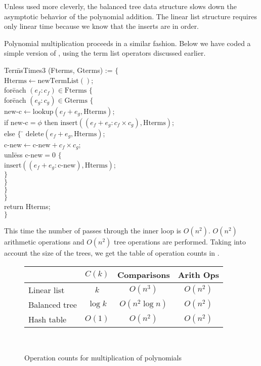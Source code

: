 Unless used more cleverly, the balanced tree data structure slows down
the asymptotic behavior of the polynomial addition.  The linear list
structure requires only linear time because we know that the inserts are in
order.

\medskip
Polynomial multiplication proceeds in a similar fashion.  Below we
have coded a simple version of , using the term list
operators discussed earlier.

\begindsacode
Ter\=msTimes3 (Fterms, Gterms) := $\{$ \\
\> $\mbox{Hterms} \leftarrow \mbox{newTermList}()$; \\
\> for\=each $(e_f : c_f) \in \mbox{Fterms}$ $\{$ \\
\>\> for\=each $(e_g : c_g) \in \mbox{Gterms}$ $\{$ \\
\>\>\> $\mbox{new-c} \leftarrow \mbox{lookup}(e_f + e_g, \mbox{Hterms})$;\\
\>\>\> if $\mbox{new-c} = \phi$ then $\mbox{insert}((e_f + e_g : c_f \times c_g), \mbox{Hterms})$;\\
\>\>\> else $\{$ \= $\mbox{delete}(e_f + e_g, \mbox{Hterms})$; \\
\>\>\>\> $\mbox{c-new} \leftarrow \mbox{c-new} + c_f \times c_g$; \\
\>\>\>\> unl\=ess $\mbox{c-new} = 0$ $\{$ \\
\>\>\>\>\> $\mbox{insert}((e_f + e_g : \mbox{c-new}), \mbox{Hterms})$;\\
\>\>\>\>\> $\}$\\
\>\>\>\> $\}$\\
\>\>\> $\}$\\
\>\> $\}$ \\
\> return Hterms; \\
\> $\}$
\enddsacode

This time the number of passes through the inner loop is $O(n^2)$.
$O(n^2)$ arithmetic operations and $O(n^2)$ tree operations are
performed.  Taking into account the size of the trees, we get the
table of operation counts in .

\begin{figure}
\begin{center}
\begin{tabular}{|l|c|c|c|} 
\multicolumn{1}{l}{}& \multicolumn{1}{c}{$C(k)$} & 
  \multicolumn{1}{c}{Comparisons} & \multicolumn{1}{c}{Arith Ops} \\ \hline
Linear list & $k$ & $O(n^3)$ & $O(n^2)$ \\ \hline
Balanced tree & $\log k$ & $O(n^2 \log n)$ & $O(n^2)$ \\ \hline
Hash table & $O(1)$ & $O(n^2)$ & $O(n^2)$ \\ \hline
\end{tabular} \\
\end{center}
\caption{Operation counts for multiplication of
polynomials\label{OperationCount:Mult:Fig}} 
\end{figure}

